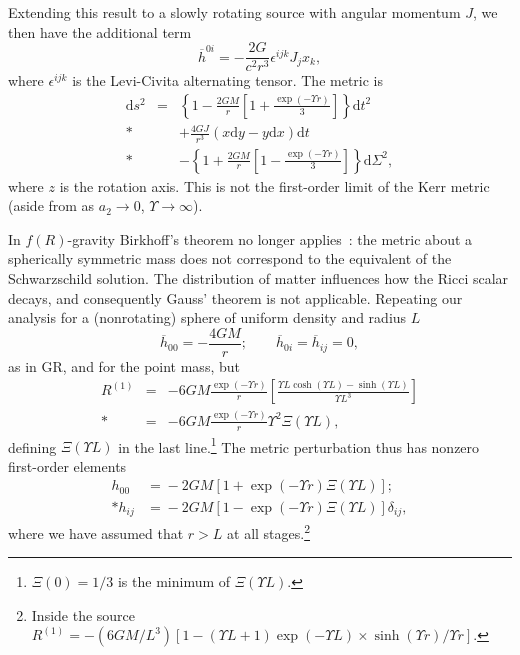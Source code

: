 \documentclass[aps,prd,amsfonts,amssymb,amsmath,nofootinbib,reprint,showpacs]{revtex4-1}
\newcommand{\dd}{\ensuremath{\text{d}}}
\begin{document}
Extending this result to a slowly rotating source with angular momentum $J$, we then have the additional term~\cite{Hobson2006}
\begin{equation}
\overline{h}^{0i} = -\frac{2G}{c^2r^3} \epsilon^{ijk}J_j x_k,
\end{equation}
where $\epsilon^{ijk}$ is the Levi-Civita alternating tensor. The metric is
\begin{eqnarray}
\dd s^2 & = & \left\{1-\frac{2GM}{r}\left[1 + \frac{\exp(- \Upsilon r)}{3}\right]\right\}\dd t^2 \nonumber \\*
& & + {} \frac{4GJ}{r^3}\left(x\dd y - y\dd x\right)\dd t \nonumber \\*
& & - {} \left\{1 +\frac{2GM}{r}\left[1 - \frac{\exp(- \Upsilon r)}{3}\right]\right\}\dd \Sigma^2,\label{eq:f(R)_Kerr}
\end{eqnarray}
where $z$ is the rotation axis. This is not the first-order limit of the Kerr metric (aside from as $a_2 \rightarrow 0$, $\Upsilon \rightarrow \infty$).

In $f(R)$-gravity Birkhoff's theorem no longer applies~\cite{Pechlaner1966, Stelle1978, Clifton2006, Capozziello2009b, Stabile2010}: the metric about a spherically symmetric mass does not correspond to the equivalent of the Schwarzschild solution. The distribution of matter influences how the Ricci scalar decays, and consequently Gauss' theorem is not applicable. Repeating our analysis for a (nonrotating) sphere of uniform density and radius $L$
\begin{equation}
\overline{h}_{00} = -\frac{4GM}{r}; \qquad \overline{h}_{0i} = \overline{h}_{ij} = 0,
\end{equation}
as in GR, and for the point mass, but
\begin{eqnarray}
R^{(1)} & = & -6 G M \frac{\exp(- \Upsilon r)}{r}\left[\frac{\Upsilon L\cosh(\Upsilon L) - \sinh(\Upsilon L)}{\Upsilon L^3}\right] \nonumber \\*
 & = &  -6 G M \frac{\exp(- \Upsilon r)}{r}\Upsilon^2\Xi(\Upsilon L),
\end{eqnarray}
defining $\Xi(\Upsilon L)$ in the last line.\footnote{$\Xi(0) = 1/3$ is the minimum of $\Xi(\Upsilon L)$.} The metric perturbation thus has nonzero first-order elements~\cite{Stelle1978, Capozziello2009b, Stabile2010}
\begin{equation}
\begin{split}
h_{00} & = {} -2 G M \left[1 + \exp(- \Upsilon r)\Xi(\Upsilon L)\right]; \\*
h_{ij} & = {} -2 G M \left[1 - \exp(- \Upsilon r)\Xi(\Upsilon L)\right]\delta_{ij},
\label{eq:Uniform}
\end{split}
\end{equation}
where we have assumed that $r > L$ at all stages.\footnote{Inside the source $R^{(1)} = -{(6 G M/{L^3})}[1 - (\Upsilon L + 1)\exp(-\Upsilon L) \times\sinh(\Upsilon r)/\Upsilon r]$.}
\end{document}
